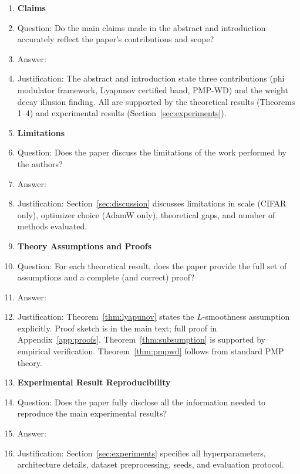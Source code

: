 \documentclass{article}
\begin{document}
\begin{enumerate}

\item {\bf Claims}
    \item[] Question: Do the main claims made in the abstract and introduction accurately reflect the paper's contributions and scope?
    \item[] Answer: \answerYes{}
    \item[] Justification: The abstract and introduction state three contributions (phi modulator framework, Lyapunov certified band, PMP-WD) and the weight decay illusion finding. All are supported by the theoretical results (Theorems 1--4) and experimental results (Section~\ref{sec:experiments}).

\item {\bf Limitations}
    \item[] Question: Does the paper discuss the limitations of the work performed by the authors?
    \item[] Answer: \answerYes{}
    \item[] Justification: Section~\ref{sec:discussion} discusses limitations in scale (CIFAR only), optimizer choice (AdamW only), theoretical gaps, and number of methods evaluated.

\item {\bf Theory Assumptions and Proofs}
    \item[] Question: For each theoretical result, does the paper provide the full set of assumptions and a complete (and correct) proof?
    \item[] Answer: \answerYes{}
    \item[] Justification: Theorem~\ref{thm:lyapunov} states the $L$-smoothness assumption explicitly. Proof sketch is in the main text; full proof in Appendix~\ref{app:proofs}. Theorem~\ref{thm:subsumption} is supported by empirical verification. Theorem~\ref{thm:pmpwd} follows from standard PMP theory.

\item {\bf Experimental Result Reproducibility}
    \item[] Question: Does the paper fully disclose all the information needed to reproduce the main experimental results?
    \item[] Answer: \answerYes{}
    \item[] Justification: Section~\ref{sec:experiments} specifies all hyperparameters, architecture details, dataset preprocessing, seeds, and evaluation protocol.


\end{enumerate}
\end{document}
